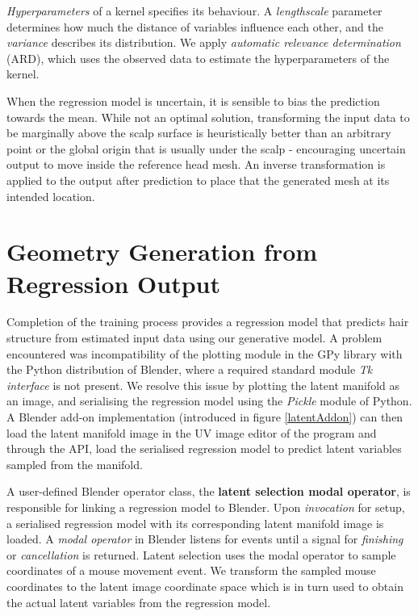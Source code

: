 \documentclass[ %
author={Dillon Keith Diep},
supervisor={Dr. Carl Henrik Ek},
degree={MEng},
title={ART-CG Hair:},
subtitle={Assisted Real-time Content Generation of Stylised Virtual Hair},
type={Research},
year={2017} ]{dissertation}
\begin{document}
	\textit{Hyperparameters} of a kernel specifies its behaviour. A \textit{lengthscale} parameter determines how much the distance of variables influence each other, and the \textit{variance} describes its distribution. We apply \textit{automatic relevance determination} (ARD), which uses the observed data to estimate the hyperparameters of the kernel.
	
	When the regression model is uncertain, it is sensible to bias the prediction towards the mean. While not an optimal solution, transforming the input data to be marginally above the scalp surface is heuristically better than an arbitrary point or the global origin that is usually under the scalp - encouraging uncertain output to move inside the reference head mesh. An inverse transformation is applied to the output after prediction to place that the generated mesh at its intended location. 
	
	\section{Geometry Generation from Regression Output}
	Completion of the training process provides a regression model that predicts hair structure from estimated input data using our generative model. A problem encountered was incompatibility of the plotting module in the GPy library with the Python distribution of Blender, where a required standard module \textit{Tk interface} is not present. We resolve this issue by plotting the latent manifold as an image, and serialising the regression model using the \textit{Pickle} module of Python. A Blender add-on implementation (introduced in figure \ref{latentAddon}) can then load the latent manifold image in the UV image editor of the program and through the API, load the serialised regression model to predict latent variables sampled from the manifold.
	
	A user-defined Blender operator class, the \textbf{latent selection modal operator}, is responsible for linking a regression model to Blender. Upon \textit{invocation} for setup, a serialised regression model with its corresponding latent manifold image is loaded. A \textit{modal operator} in Blender listens for events until a signal for \textit{finishing} or \textit{cancellation} is returned. Latent selection uses the modal operator to sample coordinates of a mouse movement event. We transform the sampled mouse coordinates to the latent image coordinate space which is in turn used to obtain the actual latent variables from the regression model. 
	
\end{document}
